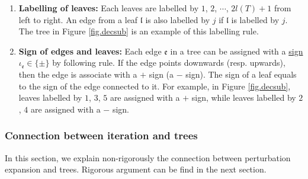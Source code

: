 \begin{defn}
\begin{enumerate}
    \item \textbf{Labelling of leaves:} Each leaves are labelled by $1$, $2$, $\cdots$, $2l(T)+1$ from left to right. An edge from a leaf $\mathfrak{l}$ is also labelled by $j$ if $\mathfrak{l}$ is labelled by $j$. The tree in Figure \ref{fig.decsub} is an example of this labelling rule.


    \item \textbf{Sign of edges and leaves:} Each edge $\mathfrak{e}$ in a tree can be assigned with a \underline{sign} $\iota_{\mathfrak{e}}\in\{\pm\}$ by following rule. If the edge points downwards (resp. upwards), then the edge is associate with a $+$ sign (a $-$ sign). The sign of a leaf equals to the sign of the edge connected to it. For example, in Figure \ref{fig.decsub}, leaves labelled by $1$, $3$, $5$ are assigned with a $+$ sign, while leaves labelled by $2$, $4$ are assigned with a $-$ sign.
    

\end{enumerate}

    


\end{defn}





\subsubsection{Connection between iteration and trees}\label{sec.connection} In this section, we explain non-rigorously the connection between perturbation expansion and trees. Rigorous argument can be find in the next section. 

